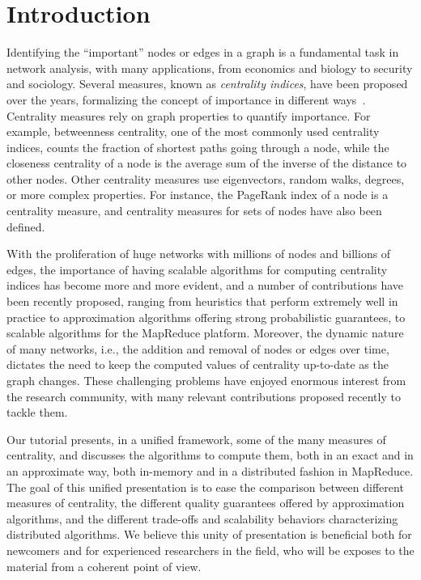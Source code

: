 \documentclass[pdfpagelabels=false]{sig-alternate-2013} %
\begin{document}


\section{Introduction}
Identifying the ``important'' nodes or edges in a graph is a fundamental task
in network analysis, with many applications, from economics and biology to security and sociology.
Several measures, known as \emph{centrality indices}, have been proposed over the years, 
formalizing the concept of importance in different ways~\citep{Newman10}. Centrality measures
rely on graph properties to quantify importance. For example, betweenness
centrality, one of the most commonly used centrality indices, counts the fraction
of shortest paths going through a node, while the closeness centrality of a node
is the average sum of the inverse of the distance to other nodes. Other
centrality measures use eigenvectors, random walks, degrees, or more complex
properties. For instance, the PageRank index of a node is a centrality measure, and
centrality measures for sets of nodes have also been defined.

With the proliferation of huge networks with millions of nodes and billions of
edges, the importance of having scalable algorithms for computing centrality
indices has become more and more evident, and a number of contributions have been
recently proposed, ranging from heuristics that perform extremely well in
practice to approximation algorithms offering strong probabilistic guarantees,
to scalable algorithms for the MapReduce platform. Moreover, the dynamic nature
of many networks, i.e., the addition and removal of nodes or edges over
time, dictates the need to keep the computed values of centrality up-to-date as
the graph changes. These challenging problems have enjoyed enormous interest
from the research community, with many relevant contributions proposed recently
to tackle them.

Our tutorial presents, in a unified framework, some of the many measures of
centrality, and discusses the algorithms to compute them, both in an exact and in
an approximate way, both in-memory and in a distributed fashion in MapReduce.
The goal of this unified presentation is to ease the
comparison between different measures of centrality, the different quality
guarantees offered by approximation algorithms, and the different trade-offs and
scalability behaviors characterizing distributed algorithms. We believe
this unity of presentation is beneficial both for newcomers and for
experienced researchers in the field, who will be exposes to the material from a
coherent point of view.
\end{document}
